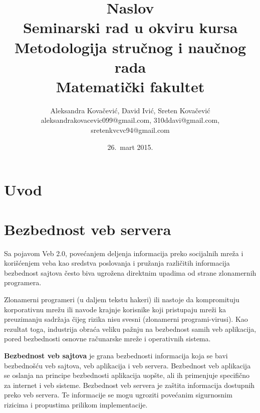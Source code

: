 \documentclass[a4paper]{article}
\begin{document}
\title{Naslov\\ \small{Seminarski rad u okviru kursa\\Metodologija stručnog i naučnog rada\\ Matematički fakultet}}

\author{Aleksandra Kovačević, David Ivić, Sreten Kovačević\\ aleksandrakovacevic099@gmail.com, 310ddavi@gmail.com,\\ sretenkvcvc94@gmail.com}
\date{26.~mart 2015.}
\maketitle

\abstract{
}

\tableofcontents

\newpage

\section{Uvod}
\section{Bezbednost veb servera}


Sa pojavom Veb 2.0, pove\'{c}anjem deljenja informacija preko socijalnih mre\v{z}a i kori\v{s}\'{c}enjem veba kao sredstva poslovanja i pru\v{z}anja razli\v{c}itih informacija bezbednost sajtova \v{c}esto biva ugro\v{z}ena direktnim upadima od strane zlonamernih programera.

Zlonamerni programeri (u daljem tekstu hakeri) ili nastoje da kompromituju korporativnu mre\v{z}u ili navode krajnje korisnike koji pristupaju mre\v{z}i ka preuzimanju sadr\v{z}aja \v{c}ijeg rizika nisu svesni (zlonamerni programi-virusi). Kao rezultat toga, industrija obra\'{c}a veliku pa\v{z}nju na bezbednost samih veb aplikacija, pored bezbednosti osnovne ra\v{c}unarske mre\v{z}e i operativnih sistema.

\textbf{Bezbednost veb sajtova} je grana bezbednosti informacija koja se bavi bezbedno\v{s}\'{c}u veb sajtova, veb aplikacija i veb servera. Bezbednost veb aplikacija se oslanja na principe bezbednosti aplikacija uop\v{s}te, ali ih primenjuje specifi\v{c}no za internet i veb sisteme.
Bezbednost veb servera je za\v{s}tita informacija dostupnih preko veb servera. Te informacije se mogu ugroziti pove\'{c}anim sigurnosnim rizicima i propustima prilikom implementacije.
\end{document}
